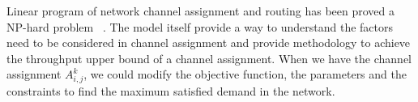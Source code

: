 Linear program of network channel assignment and routing has been proved a NP-hard problem ~\cite{tang2005interference,yuan2006cross}. 
The model itself provide a way to understand the factors need to be considered in channel assignment and provide methodology to achieve the throughput upper bound of a channel assignment.
When we have the channel assignment $A_{i,j}^k$, we could modify the objective function, the parameters and the constraints to find the maximum satisfied demand in the network. 





